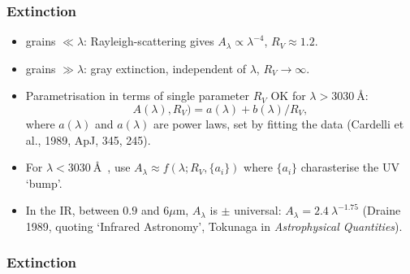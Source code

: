 \begin{frame}\frametitle{Extinction}

\begin{itemize}


\item grains $\ll \lambda$: Rayleigh-scattering gives $A_\lambda \propto
\lambda^{-4}$, $R_V \approx 1.2$. 

\item grains $\gg \lambda$: gray extinction, independent of 
$\lambda$, $R_V \rightarrow \infty$.


\item Parametrisation in terms of single parameter  $R_V$ OK for
$\lambda > 3030~$\AA:
\[ A(\lambda),R_V) = a(\lambda)  + b(\lambda) / R_V, \]
where $a(\lambda)$ and $a(\lambda)$ are power laws, set by fitting the
data (Cardelli et al., 1989, ApJ, 345, 245). 

\item For $\lambda < 3030~$\AA~, use $A_\lambda \approx f(\lambda;
R_V,\{a_i\})$ where $\{a_i\}$ charasterise the UV `bump'.

\item In the  IR, between  $0.9$ and  $6\mu\mathrm{m}$, $A_\lambda$ is $\pm$
universal: $A_\lambda = 2.4~\lambda^{-1.75}$ (Draine 1989, quoting
`Infrared Astronomy', Tokunaga in {\em Astrophysical Quantities}).

\end{itemize}


\end{frame}
\begin{frame}\frametitle{Extinction}


\begin{center}
\end{center}


\end{frame}
